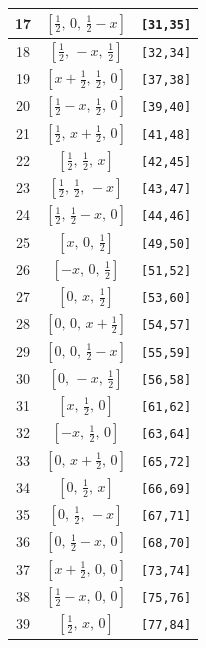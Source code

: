 \documentclass[fleqn,8pt]{jsarticle}
\begin{document}
\begin{longtable}{ccc}
17 & $\left[ \frac{1}{2},\, 0,\, \frac{1}{2} - x \right]$ & {\tt [31,35]} \\ \hline
18 & $\left[ \frac{1}{2},\, - x,\, \frac{1}{2} \right]$ & {\tt [32,34]} \\ \hline
19 & $\left[ x + \frac{1}{2},\, \frac{1}{2},\, 0 \right]$ & {\tt [37,38]} \\ \hline
20 & $\left[ \frac{1}{2} - x,\, \frac{1}{2},\, 0 \right]$ & {\tt [39,40]} \\ \hline
21 & $\left[ \frac{1}{2},\, x + \frac{1}{2},\, 0 \right]$ & {\tt [41,48]} \\ \hline
22 & $\left[ \frac{1}{2},\, \frac{1}{2},\, x \right]$ & {\tt [42,45]} \\ \hline
23 & $\left[ \frac{1}{2},\, \frac{1}{2},\, - x \right]$ & {\tt [43,47]} \\ \hline
24 & $\left[ \frac{1}{2},\, \frac{1}{2} - x,\, 0 \right]$ & {\tt [44,46]} \\ \hline
25 & $\left[ x,\, 0,\, \frac{1}{2} \right]$ & {\tt [49,50]} \\ \hline
26 & $\left[ - x,\, 0,\, \frac{1}{2} \right]$ & {\tt [51,52]} \\ \hline
27 & $\left[ 0,\, x,\, \frac{1}{2} \right]$ & {\tt [53,60]} \\ \hline
28 & $\left[ 0,\, 0,\, x + \frac{1}{2} \right]$ & {\tt [54,57]} \\ \hline
29 & $\left[ 0,\, 0,\, \frac{1}{2} - x \right]$ & {\tt [55,59]} \\ \hline
30 & $\left[ 0,\, - x,\, \frac{1}{2} \right]$ & {\tt [56,58]} \\ \hline
31 & $\left[ x,\, \frac{1}{2},\, 0 \right]$ & {\tt [61,62]} \\ \hline
32 & $\left[ - x,\, \frac{1}{2},\, 0 \right]$ & {\tt [63,64]} \\ \hline
33 & $\left[ 0,\, x + \frac{1}{2},\, 0 \right]$ & {\tt [65,72]} \\ \hline
34 & $\left[ 0,\, \frac{1}{2},\, x \right]$ & {\tt [66,69]} \\ \hline
35 & $\left[ 0,\, \frac{1}{2},\, - x \right]$ & {\tt [67,71]} \\ \hline
36 & $\left[ 0,\, \frac{1}{2} - x,\, 0 \right]$ & {\tt [68,70]} \\ \hline
37 & $\left[ x + \frac{1}{2},\, 0,\, 0 \right]$ & {\tt [73,74]} \\ \hline
38 & $\left[ \frac{1}{2} - x,\, 0,\, 0 \right]$ & {\tt [75,76]} \\ \hline
39 & $\left[ \frac{1}{2},\, x,\, 0 \right]$ & {\tt [77,84]} \\ \hline

\end{longtable}
\end{document}
